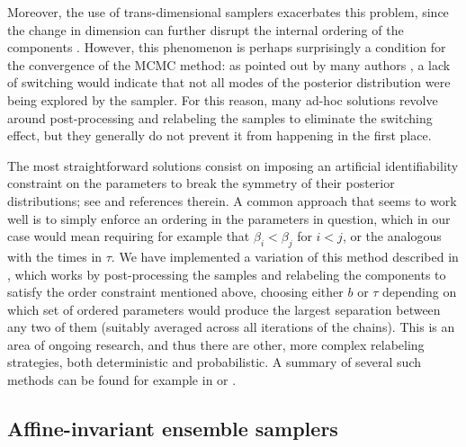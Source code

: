 Moreover, the use of trans-dimensional samplers exacerbates this problem, since the change in dimension can further disrupt the internal ordering of the components \citep[see][]{roodaki2014relabeling}. However, this phenomenon is perhaps surprisingly a condition for the convergence of the MCMC method: as pointed out by many authors \citep[e.g.][]{celeux2000computational}, a lack of switching would indicate that not all modes of the posterior distribution were being explored by the sampler. For this reason, many ad-hoc solutions revolve around post-processing and relabeling the samples to eliminate the switching effect, but they generally do not prevent it from happening in the first place.

The most straightforward solutions consist on imposing an artificial identifiability constraint on the parameters to break the symmetry of their posterior distributions; see \citet{jasra2005markov} and references therein. A common approach that seems to work well is to simply enforce an ordering in the parameters in question, which in our case would mean requiring for example that \(\beta_i < \beta_j\) for \(i < j\), or the analogous with the times in \(\tau\). We have implemented a variation of this method described in \citet{simola2021approximate}, which works by post-processing the samples and relabeling the components to satisfy the order constraint mentioned above, choosing either \(b\) or \(\tau\) depending on which set of ordered parameters would produce the largest separation between any two of them (suitably averaged across all iterations of the chains). This is an area of ongoing research, and thus there are other, more complex relabeling strategies, both deterministic and probabilistic. A summary of several such methods can be found for example in \citet{sperrin2010probabilistic} or \citet{rodriguez2014label}.

\subsection{Affine-invariant ensemble samplers}\label{app:ensemble-sampler}

